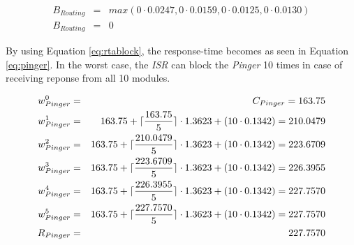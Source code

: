 \begin{eqnarray}
\label{eq:pingerblock}
     B_{Routing} &=& max(0 \cdot 0.0247, 0 \cdot 0.0159, 0 \cdot 0.0125, 0 \cdot 0.0130) \nonumber \\
     B_{Routing} &=& 0
\end{eqnarray}

By using Equation \ref{eq:rtablock}, the response-time becomes as seen in Equation \ref{eq:pinger}. In the worst case, the \textit{ISR} can block the \textit{Pinger} 10 times in case of receiving reponse from all 10 modules.

\begin{eqnarray}
\label{eq:pinger}
    w_{Pinger}^0 &=& C_{Pinger} = 163.75 \nonumber \\ 
    w_{Pinger}^1 &=& 163.75 + \lceil\frac{163.75}{5}\rceil \cdot 1.3623 + (10 \cdot 0.1342) = 210.0479 \nonumber \\ 
    w_{Pinger}^2 &=& 163.75 + \lceil\frac{210.0479}{5}\rceil \cdot 1.3623 + (10 \cdot 0.1342) = 223.6709 \nonumber \\
    w_{Pinger}^3 &=& 163.75 + \lceil\frac{223.6709}{5}\rceil \cdot 1.3623 + (10 \cdot 0.1342) = 226.3955 \nonumber \\
    w_{Pinger}^4 &=& 163.75 + \lceil\frac{226.3955}{5}\rceil \cdot 1.3623 + (10 \cdot 0.1342) = 227.7570 \nonumber \\
    w_{Pinger}^5 &=& 163.75 + \lceil\frac{227.7570}{5}\rceil \cdot 1.3623 + (10 \cdot 0.1342) = 227.7570 \nonumber \\
    R_{Pinger} &=& 227.7570
\end{eqnarray}
